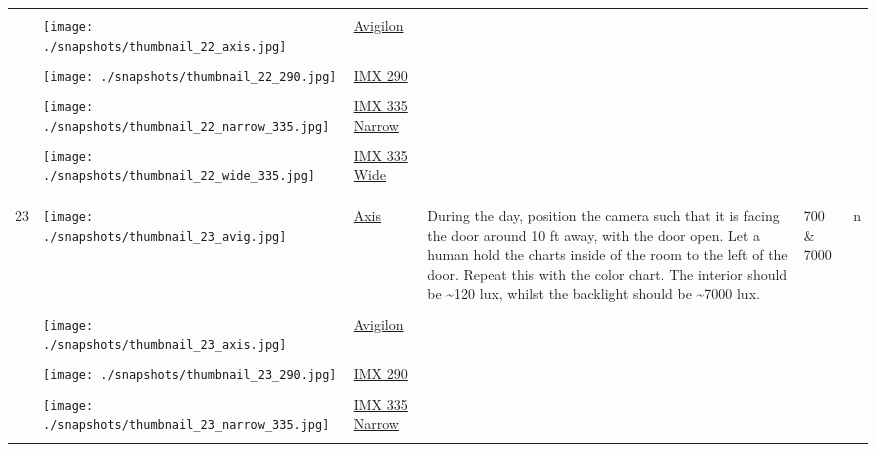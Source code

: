 \documentclass{article}%
\begin{document}
\begin{longtabu}{m{2.5cm} m{4cm} m{2cm} m{4cm} m{2cm} m{2cm}}
&&&&&\\%
&\texttt{[image: ./snapshots/thumbnail\_22\_axis.jpg]}&\href{https://drive.google.com/file/d/1QE_D4jp30H5IkQ-CFucln0C0tDE3zuZd/view?usp=sharing}{Avigilon}&&&\\%
&&&&&\\%
&\texttt{[image: ./snapshots/thumbnail\_22\_290.jpg]}&\href{https://drive.google.com/file/d/1QqgNPHyQwv9j8qK46wD3WE18JhpdGj23/view?usp=sharing}{IMX 290}&&&\\%
&&&&&\\%
&\texttt{[image: ./snapshots/thumbnail\_22\_narrow\_335.jpg]}&\href{https://drive.google.com/file/d/1tzpYV7sOVIPM0OkLSnX-huiZMO4an3v1/view?usp=sharing}{IMX 335 Narrow}&&&\\%
&&&&&\\%
&\texttt{[image: ./snapshots/thumbnail\_22\_wide\_335.jpg]}&\href{https://drive.google.com/file/d/1E1989-HHUTQs4rtA9rb57YyURvBaEC7e/view?usp=sharing}{IMX 335 Wide}&&&\\%
&&&&&\\%
&&&&&\\%
\hline%
&&&&&\\%
23&\texttt{[image: ./snapshots/thumbnail\_23\_avig.jpg]}&\href{https://drive.google.com/file/d/1SsXcva3ULX97691tGevxNvW2xPXNAJB0/view?usp=sharing}{Axis}&During the day, position the camera such that it is facing the door around 10 ft away, with the door open. Let a human hold the charts inside of the room to the left of the door. Repeat this with the color chart. The interior should be \textasciitilde{}120 lux, whilst the backlight should be \textasciitilde{}7000 lux.&700 \& 7000&n\\%
&&&&&\\%
&\texttt{[image: ./snapshots/thumbnail\_23\_axis.jpg]}&\href{https://drive.google.com/file/d/1sVZjZFd9rZ0QAYftB59ZnkrirvaVn7Dd/view?usp=sharing}{Avigilon}&&&\\%
&&&&&\\%
&\texttt{[image: ./snapshots/thumbnail\_23\_290.jpg]}&\href{https://drive.google.com/file/d/1cDIOG2ahsa2VBF78KLo0iCWjs00ULJ4j/view?usp=sharing}{IMX 290}&&&\\%
&&&&&\\%
&\texttt{[image: ./snapshots/thumbnail\_23\_narrow\_335.jpg]}&\href{https://drive.google.com/file/d/1AMvVH1A-t4cgut9D5l5XLHtFylFwfj5-/view?usp=sharing}{IMX 335 Narrow}&&&\\%
&&&&&\\%

\end{longtabu}
\end{document}
